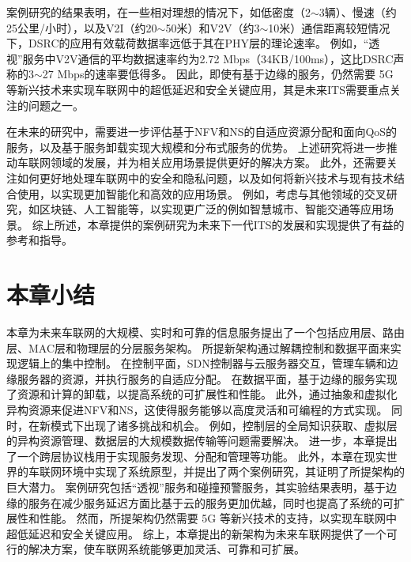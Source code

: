 案例研究的结果表明，在一些相对理想的情况下，如低密度（2$\sim$3辆）、慢速（约25公里/小时），以及V2I（约20$\sim$50米）和V2V（约3$\sim$10米）通信距离较短情况下，DSRC的应用有效载荷数据率远低于其在PHY层的理论速率。
例如，“透视”服务中V2V通信的平均数据速率约为2.72 Mbps（34KB/100ms），这比DSRC声称的3$\sim$27 Mbps的速率要低得多。
因此，即使有基于边缘的服务，仍然需要 5G 等新兴技术来实现车联网中的超低延迟和安全关键应用，其是未来ITS需要重点关注的问题之一。

在未来的研究中，需要进一步评估基于NFV和NS的自适应资源分配和面向QoS的服务，以及基于服务卸载实现大规模和分布式服务的优势。
上述研究将进一步推动车联网领域的发展，并为相关应用场景提供更好的解决方案。
此外，还需要关注如何更好地处理车联网中的安全和隐私问题，以及如何将新兴技术与现有技术结合使用，以实现更加智能化和高效的应用场景。
例如，考虑与其他领域的交叉研究，如区块链、人工智能等，以实现更广泛的例如智慧城市、智能交通等应用场景。
综上所述，本章提供的案例研究为未来下一代ITS的发展和实现提供了有益的参考和指导。

\section{本章小结}\label{section 2-5}

本章为未来车联网的大规模、实时和可靠的信息服务提出了一个包括应用层、路由层、MAC层和物理层的分层服务架构。
所提新架构通过解耦控制和数据平面来实现逻辑上的集中控制。
在控制平面，SDN控制器与云服务器交互，管理车辆和边缘服务器的资源，并执行服务的自适应分配。
在数据平面，基于边缘的服务实现了资源和计算的卸载，以提高系统的可扩展性和性能。
此外，通过抽象和虚拟化异构资源来促进NFV和NS，这使得服务能够以高度灵活和可编程的方式实现。
同时，在新模式下出现了诸多挑战和机会。
例如，控制层的全局知识获取、虚拟层的异构资源管理、数据层的大规模数据传输等问题需要解决。
进一步，本章提出了一个跨层协议栈用于实现服务发现、分配和管理等功能。
此外，本章在现实世界的车联网环境中实现了系统原型，并提出了两个案例研究，其证明了所提架构的巨大潜力。
案例研究包括“透视”服务和碰撞预警服务，其实验结果表明，基于边缘的服务在减少服务延迟方面比基于云的服务更加优越，同时也提高了系统的可扩展性和性能。
然而，所提架构仍然需要 5G 等新兴技术的支持，以实现车联网中超低延迟和安全关键应用。
综上，本章提出的新架构为未来车联网提供了一个可行的解决方案，使车联网系统能够更加灵活、可靠和可扩展。
